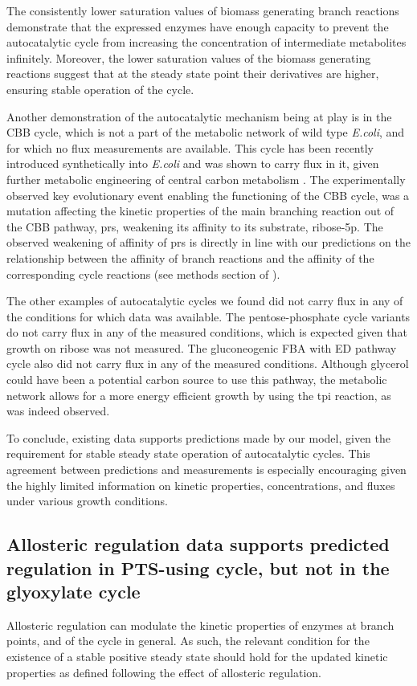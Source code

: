    The consistently lower saturation values of biomass generating branch reactions demonstrate that the expressed enzymes have enough capacity to prevent the autocatalytic cycle from increasing the concentration of intermediate metabolites infinitely.
    Moreover, the lower saturation values of the biomass generating reactions suggest that at the steady state point their derivatives are higher, ensuring stable operation of the cycle.

    Another demonstration of the autocatalytic mechanism being at play is in the CBB cycle, which is not a part of the metabolic network of wild type \emph{E.coli}, and for which no flux measurements are available.
    This cycle has been recently introduced synthetically into \emph{E.coli} and was shown to carry flux in it, given further metabolic engineering of central carbon metabolism \cite{Antonovsky2016-jy}.
    The experimentally observed key evolutionary event enabling the functioning of the CBB cycle, was a mutation affecting the kinetic properties of the main branching reaction out of the CBB pathway, prs, weakening its affinity to its substrate, ribose-5p.
    The observed weakening of affinity of prs is directly in line with our predictions on the relationship between the affinity of branch reactions and the affinity of the corresponding cycle reactions (see methods section of \cite{Antonovsky2016-jy}).

    The other examples of autocatalytic cycles we found did not carry flux in any of the conditions for which data was available.
    The pentose-phosphate cycle variants do not carry flux in any of the measured conditions, which is expected given that growth on ribose was not measured.
    The gluconeogenic FBA with ED pathway cycle also did not carry flux in any of the measured conditions.
    Although glycerol could have been a potential carbon source to use this pathway, the metabolic network allows for a more energy efficient growth by using the tpi reaction, as was indeed observed.

    To conclude, existing data supports predictions made by our model, given the requirement for stable steady state operation of autocatalytic cycles.
    This agreement between predictions and measurements is especially encouraging given the highly limited information on kinetic properties, concentrations, and fluxes under various growth conditions.

    \subsection{Allosteric regulation data supports predicted regulation in PTS-using cycle, but not in the glyoxylate cycle}
    Allosteric regulation can modulate the kinetic properties of enzymes at branch points, and of the cycle in general.
    As such, the relevant condition for the existence of a stable positive steady state should hold for the updated kinetic properties as defined following the effect of allosteric regulation.

